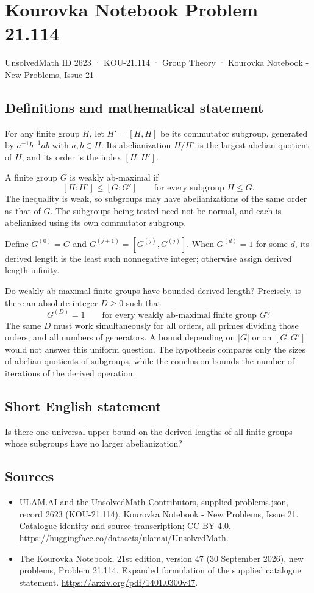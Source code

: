 \documentclass[11pt,a4paper]{article}
\begin{document}
\section*{Kourovka Notebook Problem 21.114}\label{2623}
{\small UnsolvedMath ID 2623 · KOU-21.114 · Group Theory · Kourovka Notebook - New Problems, Issue 21}
\subsection{Definitions and mathematical statement}
For any finite group $H$, let $H'=[H,H]$ be its commutator subgroup, generated by $a^{-1}b^{-1}ab$ with $a,b\in H$. Its abelianization $H/H'$ is the largest abelian quotient of $H$, and its order is the index $[H:H']$.

A finite group $G$ is weakly ab-maximal if
\[
 [H:H']\le[G:G']\qquad\text{for every subgroup }H\le G.
\]
The inequality is weak, so subgroups may have abelianizations of the same order as that of $G$. The subgroups being tested need not be normal, and each is abelianized using its own commutator subgroup.

Define $G^{(0)}=G$ and $G^{(j+1)}=[G^{(j)},G^{(j)}]$. When $G^{(d)}=1$ for some $d$, its derived length is the least such nonnegative integer; otherwise assign derived length infinity.

Do weakly ab-maximal finite groups have bounded derived length? Precisely, is there an absolute integer $D\ge0$ such that
\[
 G^{(D)}=1\qquad\text{for every weakly ab-maximal finite group }G?
\]
The same $D$ must work simultaneously for all orders, all primes dividing those orders, and all numbers of generators. A bound depending on $|G|$ or on $[G:G']$ would not answer this uniform question. The hypothesis compares only the sizes of abelian quotients of subgroups, while the conclusion bounds the number of iterations of the derived operation.
\subsection{Short English statement}
Is there one universal upper bound on the derived lengths of all finite groups whose subgroups have no larger abelianization?
\subsection{Sources}
\begin{itemize}
\item[S1] ULAM.AI and the UnsolvedMath Contributors, supplied problems.json, record 2623 (KOU-21.114), Kourovka Notebook - New Problems, Issue 21. Catalogue identity and source transcription; CC BY 4.0.
\url{https://huggingface.co/datasets/ulamai/UnsolvedMath}.
\item[S2] The Kourovka Notebook, 21st edition, version 47 (30 September 2026), new problems, Problem 21.114. Expanded formulation of the supplied catalogue statement.
\url{https://arxiv.org/pdf/1401.0300v47}.
\end{itemize}
\end{document}
